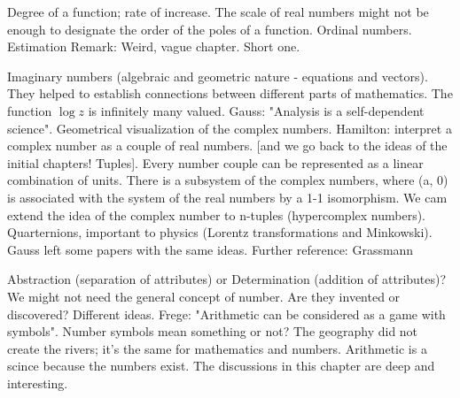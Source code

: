 \documentclass{cornell}
\begin{document}
%
{Degree of a function; rate of increase. The scale of real numbers might not be enough to designate the order of the poles of a function. Ordinal numbers. Estimation}%
{Remark: Weird, vague chapter. Short one.}%

%
{Imaginary numbers (algebraic and geometric nature - equations and vectors). They helped to establish connections between different parts of mathematics. The function \( \log z \) is infinitely many valued. Gauss: "Analysis is a self-dependent science". Geometrical visualization of the complex numbers. Hamilton: interpret a complex number as a couple of real numbers. [and we go back to the ideas of the initial chapters! Tuples]. Every number couple can be represented as a linear combination of units. There is a subsystem of the complex numbers, where (a, 0) is associated with the system of the real numbers by a 1-1 isomorphism. We cam extend the idea of the complex number to n-tuples (hypercomplex numbers). Quarternions, important to physics (Lorentz transformations and Minkowski). Gauss left some papers with the same ideas. }%
{Further reference: Grassmann}%

%
{Abstraction (separation of attributes) or Determination (addition of attributes)? We might not need the general concept of number. Are they invented or discovered? Different ideas. Frege: "Arithmetic can be considered as a game with symbols". Number symbols mean something or not? The geography did not create the rivers; it's the same for mathematics and numbers. Arithmetic is a scince because the numbers exist. The discussions in this chapter are deep and interesting. }%



\end{document}
